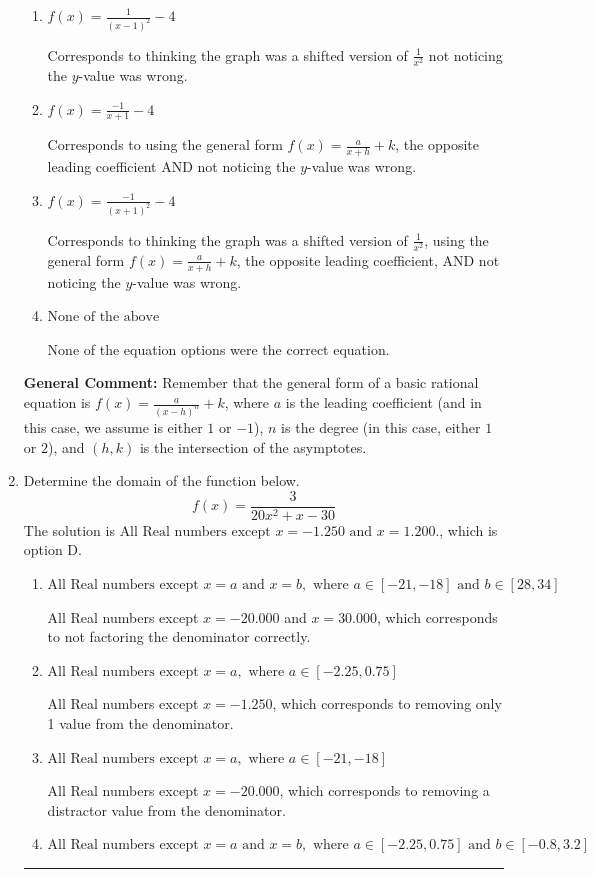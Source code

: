 \documentclass{extbook}[14pt]
\newcommand{\litem}[1]{\item #1

\rule{\textwidth}{0.4pt}}
\begin{document}
\begin{enumerate}
{\begin{enumerate}[label=\Alph*.]
The $y$-value of the equation does not match the graph.
\item \( f(x) = \frac{1}{(x - 1)^2} - 4 \)

Corresponds to thinking the graph was a shifted version of $\frac{1}{x^2}$ not noticing the $y$-value was wrong.
\item \( f(x) = \frac{-1}{x + 1} - 4 \)

Corresponds to using the general form $f(x) = \frac{a}{x+h}+k$, the opposite leading coefficient AND not noticing the $y$-value was wrong.
\item \( f(x) = \frac{-1}{(x + 1)^2} - 4 \)

Corresponds to thinking the graph was a shifted version of $\frac{1}{x^2}$, using the general form $f(x) = \frac{a}{x+h}+k$, the opposite leading coefficient, AND not noticing the $y$-value was wrong.
\item \( \text{None of the above} \)

None of the equation options were the correct equation.
\end{enumerate}

\textbf{General Comment:} Remember that the general form of a basic rational equation is $ f(x) = \frac{a}{(x-h)^n} + k$, where $a$ is the leading coefficient (and in this case, we assume is either $1$ or $-1$), $n$ is the degree (in this case, either $1$ or $2$), and $(h, k)$ is the intersection of the asymptotes.
}
\litem{
Determine the domain of the function below.
\[ f(x) = \frac{3}{20x^{2} +x -30} \]The solution is \( \text{All Real numbers except } x = -1.250 \text{ and } x = 1.200. \), which is option D.\begin{enumerate}[label=\Alph*.]
\item \( \text{All Real numbers except } x = a \text{ and } x = b, \text{ where } a \in [-21, -18] \text{ and } b \in [28, 34] \)

All Real numbers except $x = -20.000$ and $x = 30.000$, which corresponds to not factoring the denominator correctly.
\item \( \text{All Real numbers except } x = a, \text{ where } a \in [-2.25, 0.75] \)

All Real numbers except $x = -1.250$, which corresponds to removing only 1 value from the denominator.
\item \( \text{All Real numbers except } x = a, \text{ where } a \in [-21, -18] \)

All Real numbers except $x = -20.000$, which corresponds to removing a distractor value from the denominator.
\item \( \text{All Real numbers except } x = a \text{ and } x = b, \text{ where } a \in [-2.25, 0.75] \text{ and } b \in [-0.8, 3.2] \)


\end{enumerate}}
\end{enumerate}
\end{document}

